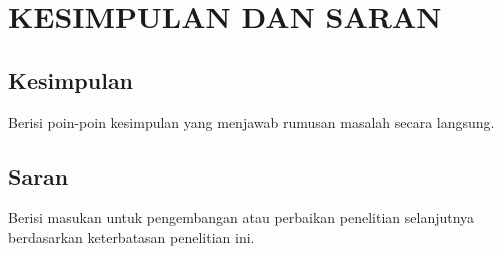 \chapter{KESIMPULAN DAN SARAN}

\section{Kesimpulan}
Berisi poin-poin kesimpulan yang menjawab rumusan masalah secara langsung.

\section{Saran}
Berisi masukan untuk pengembangan atau perbaikan penelitian selanjutnya berdasarkan keterbatasan penelitian ini.
